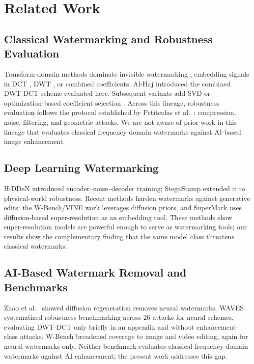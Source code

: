 \documentclass[conference]{IEEEtran}
\begin{document}
\section{Related Work}
\label{sec:related}

\subsection{Classical Watermarking and Robustness Evaluation}
Transform-domain methods dominate invisible watermarking
\cite{cox2007}, embedding signals in DCT \cite{piva1997}, DWT
\cite{barni2001}, or combined coefficients. Al-Haj \cite{alhaj2007}
introduced the combined DWT-DCT scheme evaluated here. Subsequent
variants add SVD \cite{navas2008} or optimization-based coefficient
selection \cite{rijati2025}. Across this lineage, robustness
evaluation follows the protocol established by Petitcolas et
al.~\cite{petitcolas1998}: compression, noise, filtering, and
geometric attacks. We are not aware of prior work in this lineage that
evaluates classical frequency-domain watermarks against AI-based image
enhancement.

\subsection{Deep Learning Watermarking}
HiDDeN \cite{hidden2018} introduced encoder--noise--decoder training;
StegaStamp \cite{stegastamp2020} extended it to physical-world
robustness. Recent methods harden watermarks against generative edits:
the W-Bench/VINE work \cite{wbench2024} leverages diffusion priors,
and SuperMark \cite{supermark2024} uses diffusion-based
super-resolution as an embedding tool. These methods show
super-resolution models are powerful enough to serve as watermarking
tools; our results show the complementary finding that the same model
class threatens classical watermarks.

\subsection{AI-Based Watermark Removal and Benchmarks}
Zhao et al.~\cite{zhao2023} showed diffusion regeneration removes
neural watermarks. WAVES \cite{waves2024} systematized robustness
benchmarking across 26 attacks for neural schemes, evaluating DWT-DCT
only briefly in an appendix and without enhancement-class attacks.
W-Bench \cite{wbench2024} broadened coverage to image and video
editing, again for neural watermarks only. Neither benchmark evaluates
classical frequency-domain watermarks against AI enhancement; the
present work addresses this gap.
\end{document}
